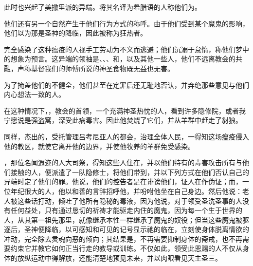 此时也兴起了美撒里派的异端。将其名译为希腊语的人称他们为。\par

他们还有另一个自然产生于他们行为方式的称呼。由于他们受到某个魔鬼的影响，他们以为那是圣神的降临，因此被称为狂热者。\par

完全感染了这种瘟疫的人视手工劳动为不义而逃避；他们沉溺于怠惰，称他们梦中的想象为预言。这异端的领袖是、、、和，以及其他一些人，他们不远离教会的共融，声称基督我们的师傅所说的神圣食物既无益也无害。\par

为了掩盖他们的不健全，他们甚至在定罪后还无耻地否认，并弃绝那些意见与他们内心想法一致的人。\par

在这种情况下，，教会的首领，一个充满神圣热忱的人，看到许多隐修院，或者我宁愿说是强盗窝，深受此病毒害。因此他焚烧了它们，并从羊群中赶走了豺狼。\par

同样，杰出的，受托管理吕考尼亚人的都会，治理全体人民，一得知这场瘟疫侵入他的教区，就使它离开他的边界，并使他牧养的羊群免受感染。\par

，那位名闻遐迩的人大司祭，得知这些人住在，并以他们特有的毒害攻击所有与他们接触的人，便派遣了一队隐修士，将他们带到，并以下列方式在他们否认自己的异端时定了他们的罪。他说，他们的控告者是在诽谤他们，证人在作伪证；而，一位年纪很大的人，他以和善的言辞招呼他，并吩咐他坐在自己身边。然后他说：老人被这些话打动，倾吐了他所有隐秘的毒液，因为他说，对于领受圣洗圣事的人没有任何益处，只有通过恳切的祈祷才能驱走内住的魔鬼，因为每一个生于世界的人，从其第一祖先那里，就像继承本性一样继承了魔鬼的奴役；但当这些魔鬼被驱逐后，圣神便降临，以可感知和可见的记号显示祂的临在，立刻使身体脱离情欲的冲动，完全除去灵魂向恶的倾向；其结果是，不再需要抑制身体的斋戒，也不再需要约束它并教它如何正当行走的教导或训练。不仅如此，领受此恩赐的人不仅从身体的放纵运动中得解放，还能清楚地预见未来，并以肉眼看见天主圣三。\par

